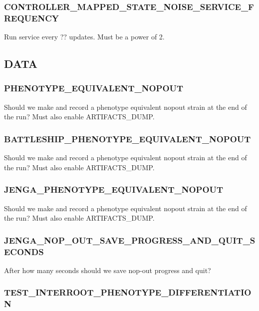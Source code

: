 \subsubsection{CONTROLLER\_MAPPED\_STATE\_NOISE\_SERVICE\_FREQUENCY}


Run service every ?? updates.
Must be a power of 2.

\subsection{DATA}

\subsubsection{PHENOTYPE\_EQUIVALENT\_NOPOUT}


Should we make and record a phenotype equivalent nopout strain at the end of the run? Must also enable ARTIFACTS\_DUMP.

\subsubsection{BATTLESHIP\_PHENOTYPE\_EQUIVALENT\_NOPOUT}


Should we make and record a phenotype equivalent nopout strain at the end of the run?
Must also enable ARTIFACTS\_DUMP.

\subsubsection{JENGA\_PHENOTYPE\_EQUIVALENT\_NOPOUT}


Should we make and record a phenotype equivalent nopout strain at the end of the run?
Must also enable ARTIFACTS\_DUMP.

\subsubsection{JENGA\_NOP\_OUT\_SAVE\_PROGRESS\_AND\_QUIT\_SECONDS}


After how many seconds should we save nop-out progress and quit?

\subsubsection{TEST\_INTERROOT\_PHENOTYPE\_DIFFERENTIATION}


